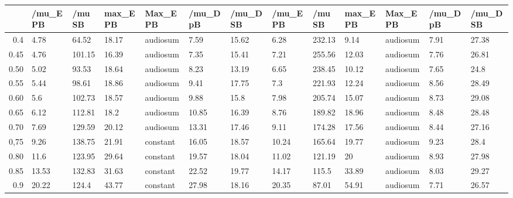 \begin{table}[ht]
\centering
\begin{tabular}{rllllllllllll}
  \hline
 & /mu\_E PB & /mu SB & max\_E PB & Max\_E PB & /mu\_D pB & /mu\_D SB & /mu\_E PB & /mu SB & max\_E PB & Max\_E PB & /mu\_D pB & /mu\_D SB \\ 
  \hline
0.4 & 4.78 & 64.52 & 18.17 & audiosum & 7.59 & 15.62 & 6.28 & 232.13 & 9.14 & audiosum & 7.91 & 27.38 \\ 
  0.45 & 4.76 & 101.15 & 16.39 & audiosum & 7.35 & 15.41 & 7.21 & 255.56 & 12.03 & audiosum & 7.76 & 26.81 \\ 
  0.50 & 5.02 & 93.53 & 18.64 & audiosum & 8.23 & 13.19 & 6.65 & 238.45 & 10.12 & audiosum & 7.65 & 24.8 \\ 
  0.55 & 5.44 & 98.61 & 18.86 & audiosum & 9.41 & 17.75 & 7.3 & 221.93 & 12.24 & audiosum & 8.56 & 28.49 \\ 
  0.60 & 5.6 & 102.73 & 18.57 & audiosum & 9.88 & 15.8 & 7.98 & 205.74 & 15.07 & audiosum & 8.73 & 29.08 \\ 
  0.65 & 6.12 & 112.81 & 18.2 & audiosum & 10.85 & 16.39 & 8.76 & 189.82 & 18.96 & audiosum & 8.48 & 28.48 \\ 
  0.70 & 7.69 & 129.59 & 20.12 & audiosum & 13.31 & 17.46 & 9.11 & 174.28 & 17.56 & audiosum & 8.44 & 27.16 \\ 
  0,75 & 9.26 & 138.75 & 21.91 & constant & 16.05 & 18.57 & 10.24 & 165.64 & 19.77 & audiosum & 9.23 & 28.4 \\ 
  0.80 & 11.6 & 123.95 & 29.64 & constant & 19.57 & 18.04 & 11.02 & 121.19 & 20 & audiosum & 8.93 & 27.98 \\ 
  0.85 & 13.53 & 132.83 & 31.63 & constant & 22.52 & 19.77 & 14.17 & 115.5 & 33.89 & audiosum & 8.03 & 29.27 \\ 
  0.9 & 20.22 & 124.4 & 43.77 & constant & 27.98 & 18.16 & 20.35 & 87.01 & 54.91 & audiosum & 7.71 & 26.57 \\ 
   \hline
\end{tabular}
\end{table}
